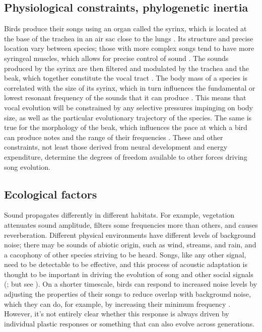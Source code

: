 \subsection{Physiological constraints, phylogenetic inertia}
Birds produce their songs using an organ called the syrinx, which is located at the base of the trachea in an air sac close to the lungs \autocite{larsen2002a}. Its structure and precise location vary between species; those with more complex songs tend to have more syringeal muscles, which allows for precise control of sound \autocite{suthers2004}. The sounds produced by the syrinx are then filtered and modulated by the trachea and the beak, which together constitute the vocal tract \autocite{podos2004}. The body mass of a species is correlated with the size of its syrinx, which in turn influences the fundamental or lowest resonant frequency of the sounds that it can produce \autocite{martin2011,ryan1985a}. This means that vocal evolution will be constrained by any selective pressures impinging on body size, as well as the particular evolutionary trajectory of the species. The same is true for the morphology of the beak, which influences the pace at which a bird can produce notes and the range of their frequencies \autocite{derryberry2012,derryberry2018,podos2001,seddon2005}. These and other constraints, not least those derived from neural development and energy expenditure, determine the degrees of freedom available to other forces driving song evolution. 

\subsection{Ecological factors }
Sound propagates differently in different habitats. For example, vegetation attenuates sound amplitude, filters some frequencies more than others, and causes reverberation. Different physical environments have different levels of background noise; there may be sounds of abiotic origin, such as wind, streams, and rain, and a cacophony of other species striving to be heard. Songs, like any other signal, need to be detectable to be effective, and this process of acoustic adaptation is thought to be important in driving the evolution of song and other social signals (\cite{Endler1992,Grant2010,Tobias2010}; but see \cite{mikula2020}). On a shorter timescale, birds can respond to increased noise levels by adjusting the properties of their songs to reduce overlap with background noise, which they can do, for example, by increasing their minimum frequency \autocite{winandy2021, liu2020, derryberry2020, roca2016, nemeth2013, halfwerk2011, brumm2004}. However, it's not entirely clear whether this response is always driven by individual plastic responses or something that can also evolve across generations.

